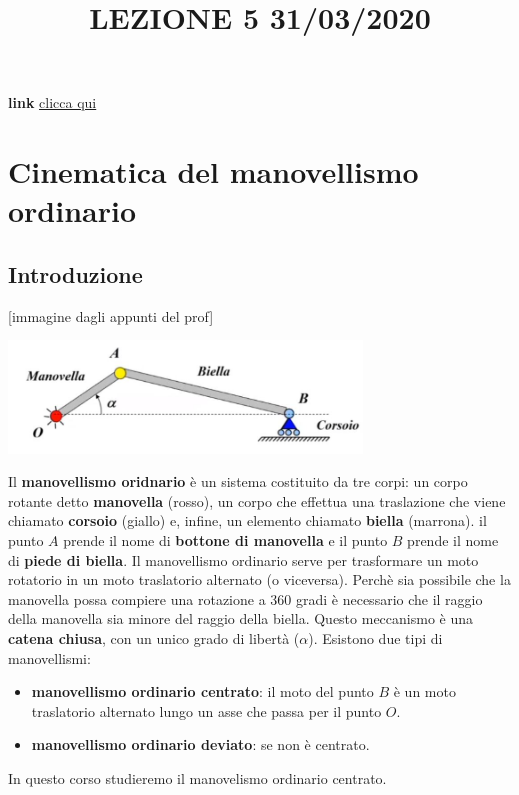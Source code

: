 \title{LEZIONE 5 31/03/2020}\newline
\textbf{link} \href{https://web.microsoftstream.com/video/acc276af-8db7-418e-bd82-ab22809fb6ac}{clicca qui}
\section{Cinematica del manovellismo ordinario}
\subsection{Introduzione}
[immagine dagli appunti del prof]
\begin{center}
    \includegraphics[height=3cm]{../lezione5/img1.JPG}
\end{center}
Il \textbf{manovellismo oridnario} è un sistema costituito da tre corpi: un corpo rotante detto \textbf{manovella} (rosso), un corpo che effettua una traslazione che viene chiamato \textbf{corsoio} (giallo) e, infine, un elemento chiamato \textbf{biella} (marrona).\newline
\newline
il punto $A$ prende il nome di \textbf{bottone di manovella} e il punto $B$ prende il nome di \textbf{piede di biella}.\newline
\newline
Il manovellismo ordinario serve per trasformare un moto rotatorio in un moto traslatorio alternato (o viceversa).\newline
\newline
Perchè sia possibile che la manovella possa compiere una rotazione a 360 gradi è necessario che il raggio della manovella sia minore del raggio della biella.\newline
\newline
Questo meccanismo è una \textbf{catena chiusa}, con un unico grado di libertà ($\alpha$).\newline
\newline
Esistono due tipi di manovellismi:
\begin{itemize}
    \item \textbf{manovellismo ordinario centrato}: il moto del punto $B$ è un moto traslatorio alternato lungo un asse che passa per il punto $O$.
    \item \textbf{manovellismo ordinario deviato}: se non è centrato.
\end{itemize}
In questo corso studieremo il manovelismo ordinario centrato.
